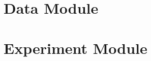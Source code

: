 \documentclass[../../fyp.tex]{subfiles}
\begin{document}
\section{Data Module}


\section{Experiment Module} \label{sec:experiment_module}

\end{document}
